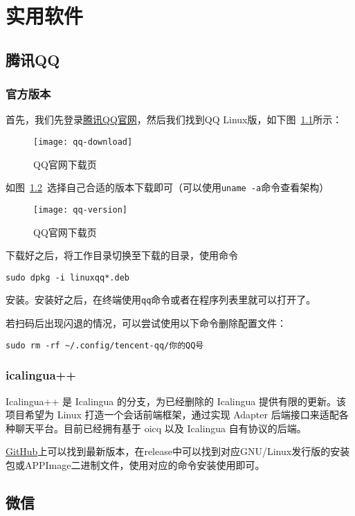 \chapter{实用软件}
\section{腾讯QQ}
\subsection{官方版本}
首先，我们先登录\href{https://im.qq.com/download/}{腾讯QQ官网}，然后我们找到QQ Linux版，如下图~\ref{fig:download-qq}所示：

\begin{figure}[htbp]
	\centering
	\texttt{[image: qq-download]}
	\caption{QQ官网下载页}\label{fig:download-qq}
\end{figure}

如图~\ref{fig:qq-version}~选择自己合适的版本下载即可（可以使用\lstinline|uname -a|命令查看架构）
\begin{figure}[htbp]
	\centering
	\texttt{[image: qq-version]}
	\caption{QQ官网下载页}\label{fig:qq-version}
\end{figure}

下载好之后，将工作目录切换至下载的目录，使用命令
\begin{lstlisting}
sudo dpkg -i linuxqq*.deb
\end{lstlisting}
安装。安装好之后，在终端使用\lstinline|qq|命令或者在程序列表里就可以打开了。

若扫码后出现闪退的情况，可以尝试使用以下命令删除配置文件：
\begin{lstlisting}
sudo rm -rf ~/.config/tencent-qq/你的QQ号
\end{lstlisting}

\subsection{icalingua++}
Icalingua++ 是 Icalingua 的分支，为已经删除的 Icalingua 提供有限的更新。该项目希望为 Linux 打造一个会话前端框架，通过实现 Adapter 后端接口来适配各种聊天平台。目前已经拥有基于 oicq 以及 Icalingua 自有协议的后端。

\href{https://github.com/Icalingua-plus-plus/Icalingua-plus-plus}{GitHub}上可以找到最新版本，在release中可以找到对应GNU/Linux发行版的安装包或APPImage二进制文件，使用对应的命令安装使用即可。

\section{微信}
